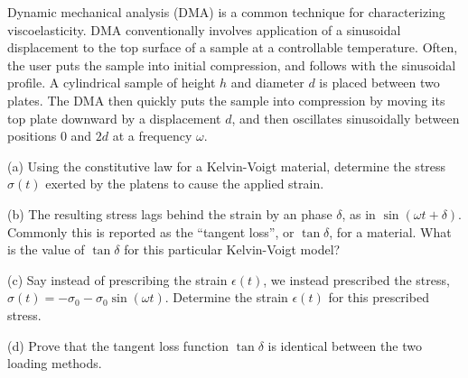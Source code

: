Dynamic mechanical analysis (DMA) is a common technique for characterizing viscoelasticity. 
DMA conventionally involves application of a sinusoidal displacement to the top surface of a sample at a controllable temperature. 
Often, the user puts the sample into initial compression, and follows with the sinusoidal profile. 
A cylindrical sample of height $h$ and diameter $d$ is placed between two plates.
The DMA then quickly puts the sample into compression by moving its top plate downward by a displacement $d$, and then oscillates sinusoidally between positions $0$ and $2d$ at a frequency $\omega$.

\medskip
(a) Using the constitutive law for a Kelvin-Voigt material, determine the stress $\sigma(t)$ exerted by the platens to cause the applied strain. 

\medskip
(b) The resulting stress lags behind the strain by an phase $\delta$, as in $\sin(\omega t + \delta)$. 
Commonly this is reported as the ``tangent loss'', or $\tan\delta$, for a material. 
What is the value of $\tan\delta$ for this particular Kelvin-Voigt model?

\medskip
(c) Say instead of prescribing the strain $\epsilon(t)$, we instead prescribed the stress, $\sigma(t) = - \sigma_0 - \sigma_0 \sin(\omega t)$. 
Determine the strain $\epsilon(t)$ for this prescribed stress.

\medskip
(d) Prove that the tangent loss function $\tan\delta$ is identical between the two loading methods.

